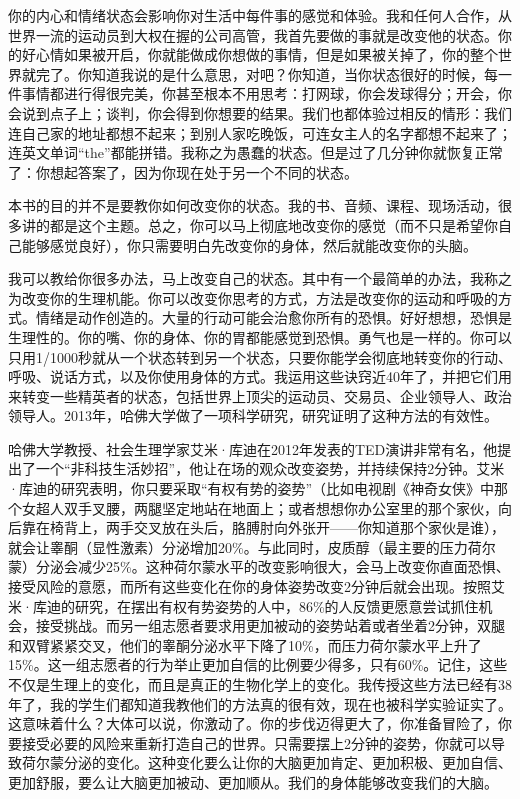 你的内心和情绪状态会影响你对生活中每件事的感觉和体验。我和任何人合作，从世界一流的运动员到大权在握的公司高管，我首先要做的事就是改变他的状态。你的好心情如果被开启，你就能做成你想做的事情，但是如果被关掉了，你的整个世界就完了。你知道我说的是什么意思，对吧？你知道，当你状态很好的时候，每一件事情都进行得很完美，你甚至根本不用思考：打网球，你会发球得分；开会，你会说到点子上；谈判，你会得到你想要的结果。我们也都体验过相反的情形：我们连自己家的地址都想不起来；到别人家吃晚饭，可连女主人的名字都想不起来了；连英文单词“the”都能拼错。我称之为愚蠢的状态。但是过了几分钟你就恢复正常了：你想起答案了，因为你现在处于另一个不同的状态。

本书的目的并不是要教你如何改变你的状态。我的书、音频、课程、现场活动，很多讲的都是这个主题。总之，你可以马上彻底地改变你的感觉（而不只是希望你自己能够感觉良好），你只需要明白先改变你的身体，然后就能改变你的头脑。

我可以教给你很多办法，马上改变自己的状态。其中有一个最简单的办法，我称之为改变你的生理机能。你可以改变你思考的方式，方法是改变你的运动和呼吸的方式。情绪是动作创造的。大量的行动可能会治愈你所有的恐惧。好好想想，恐惧是生理性的。你的嘴、你的身体、你的胃都能感觉到恐惧。勇气也是一样的。你可以只用1/1000秒就从一个状态转到另一个状态，只要你能学会彻底地转变你的行动、呼吸、说话方式，以及你使用身体的方式。我运用这些诀窍近40年了，并把它们用来转变一些精英者的状态，包括世界上顶尖的运动员、交易员、企业领导人、政治领导人。2013年，哈佛大学做了一项科学研究，研究证明了这种方法的有效性。

哈佛大学教授、社会生理学家艾米·库迪在2012年发表的TED演讲非常有名，他提出了一个“非科技生活妙招”，他让在场的观众改变姿势，并持续保持2分钟。艾米·库迪的研究表明，你只要采取“有权有势的姿势”（比如电视剧《神奇女侠》中那个女超人双手叉腰，两腿坚定地站在地面上；或者想想你办公室里的那个家伙，向后靠在椅背上，两手交叉放在头后，胳膊肘向外张开——你知道那个家伙是谁），就会让睾酮（显性激素）分泌增加20\%。与此同时，皮质醇（最主要的压力荷尔蒙）分泌会减少25\%。这种荷尔蒙水平的改变影响很大，会马上改变你直面恐惧、接受风险的意愿，而所有这些变化在你的身体姿势改变2分钟后就会出现。按照艾米·库迪的研究，在摆出有权有势姿势的人中，86\%的人反馈更愿意尝试抓住机会，接受挑战。而另一组志愿者要求用更加被动的姿势站着或者坐着2分钟，双腿和双臂紧紧交叉，他们的睾酮分泌水平下降了10\%，而压力荷尔蒙水平上升了15\%。这一组志愿者的行为举止更加自信的比例要少得多，只有60\%。记住，这些不仅是生理上的变化，而且是真正的生物化学上的变化。我传授这些方法已经有38年了，我的学生们都知道我教他们的方法真的很有效，现在也被科学实验证实了。这意味着什么？大体可以说，你激动了。你的步伐迈得更大了，你准备冒险了，你要接受必要的风险来重新打造自己的世界。只需要摆上2分钟的姿势，你就可以导致荷尔蒙分泌的变化。这种变化要么让你的大脑更加肯定、更加积极、更加自信、更加舒服，要么让大脑更加被动、更加顺从。我们的身体能够改变我们的大脑。

